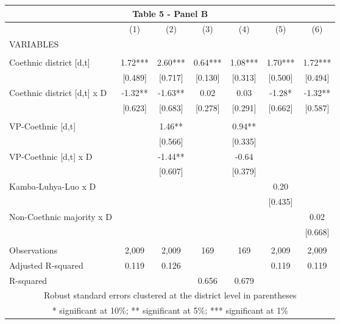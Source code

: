 \begin{tabular}{lcccccc}
\multicolumn{7}{c}{Table 5 - Panel B} \\ \hline
 & (1) & (2) & (3) & (4) & (5) & (6) \\
VARIABLES &  &  &  &  &  &  \\ \hline
 &  &  &  &  &  &  \\
Coethnic district [d,t] & 1.72*** & 2.60*** & 0.64*** & 1.08*** & 1.70*** & 1.72*** \\
 & [0.489] & [0.717] & [0.130] & [0.313] & [0.500] & [0.494] \\
Coethnic district [d,t] x D & -1.32** & -1.63** & 0.02 & 0.03 & -1.28* & -1.32** \\
 & [0.623] & [0.683] & [0.278] & [0.291] & [0.662] & [0.587] \\
 &  &  &  &  &  &  \\
VP-Coethnic [d,t] &  & 1.46** &  & 0.94** &  &  \\
 &  & [0.566] &  & [0.335] &  &  \\
VP-Coethnic [d,t] x D &  & -1.44** &  & -0.64 &  &  \\
 &  & [0.607] &  & [0.379] &  &  \\
Kamba-Luhya-Luo x D &  &  &  &  & 0.20 &  \\
 &  &  &  &  & [0.435] &  \\
Non-Coethnic majority x D &  &  &  &  &  & 0.02 \\
 &  &  &  &  &  & [0.668] \\
 &  &  &  &  &  &  \\
Observations & 2,009 & 2,009 & 169 & 169 & 2,009 & 2,009 \\
Adjusted R-squared & 0.119 & 0.126 &  &  & 0.119 & 0.119 \\
 R-squared &  &  & 0.656 & 0.679 &  &  \\ \hline
\multicolumn{7}{c}{ Robust standard errors clustered at the district level in parentheses} \\
\multicolumn{7}{c}{ * significant at 10\%; ** significant at 5\%; *** significant at 1\%} \\
\end{tabular}
